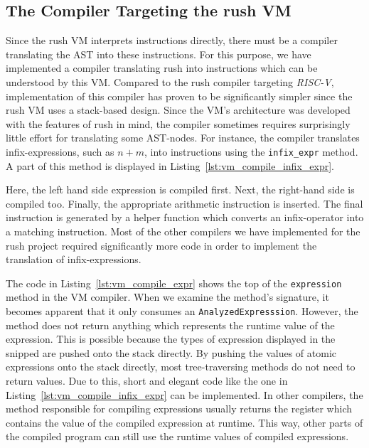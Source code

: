 \subsection{The Compiler Targeting the rush VM}

Since the rush VM interprets instructions directly, there must be a compiler translating the AST into these instructions.
For this purpose, we have implemented a compiler translating rush into instructions which can be understood by this VM\@.
Compared to the rush compiler targeting \emph{RISC-V},
implementation of this compiler has proven to be significantly simpler since the rush VM uses a stack-based design.
Since the VM's architecture was developed with the features of rush in mind,
the compiler sometimes requires surprisingly little effort for translating some AST-nodes.
For instance, the compiler translates infix-expressions, such as $n + m$, into instructions using the \texttt{infix\_expr} method.
A part of this method is displayed in Listing~\ref{lst:vm_compile_infix_expr}.


Here, the left hand side expression is compiled first.
Next, the right-hand side is compiled too.
Finally, the appropriate arithmetic instruction is inserted.
The final instruction is generated by a helper function which converts an infix-operator into a matching instruction.
Most of the other compilers we have implemented for the rush project required significantly more code in order to implement the translation of infix-expressions.


The code in Listing~\ref{lst:vm_compile_expr} shows the top of the \texttt{expression} method in the VM compiler.
When we examine the method's signature, it becomes apparent that it only consumes an \texttt{AnalyzedExpresssion}.
However, the method does not return anything which represents the runtime value of the expression.
This is possible because the types of expression displayed in the snipped are pushed onto the stack directly.
By pushing the values of atomic expressions onto the stack directly, most tree-traversing methods do not need to return values.
Due to this, short and elegant code like the one in Listing~\ref{lst:vm_compile_infix_expr} can be implemented.
In other compilers, the method responsible for compiling expressions usually returns the register which contains the value of the compiled expression at runtime.
This way, other parts of the compiled program can still use the runtime values of compiled expressions.

